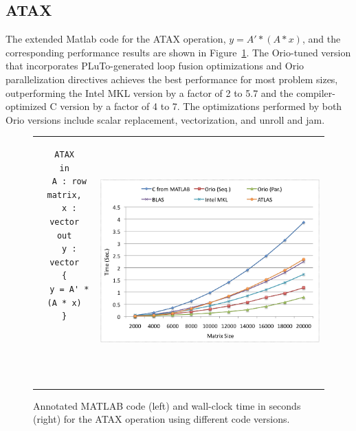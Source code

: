 \documentclass[runningheads]{llncs}
\begin{document}
\subsection{ATAX}

The extended Matlab code for the ATAX operation, $y = A' * (A * x)$, and the corresponding performance results are shown in Figure~\ref{fig:atax}. The Orio-tuned version that incorporates PLuTo-generated loop fusion optimizations and Orio parallelization directives achieves the best performance for most problem sizes, outperforming the Intel MKL version by a factor of 2 to 5.7 and the compiler-optimized C version by a factor of 4 to 7. The optimizations performed by both Orio versions include scalar replacement, vectorization, and unroll and jam.



\begin{figure}[htp]
\centering
\begin{tabular}{cc}
\begin{minipage}[b]{.3\textwidth}
\footnotesize
\begin{verbatim}
ATAX
in
  A : row matrix,
  x : vector
out
  y : vector
{
  y = A' * (A * x)
}





\end{verbatim}
\end{minipage}
&
\begin{minipage}[b]{.6\textwidth}
\includegraphics[width=\textwidth]{figures/atax.png}
\end{minipage}\\
\end{tabular}
\caption{Annotated MATLAB code (left) and wall-clock time in seconds (right) for the ATAX operation using different code versions.}
\label{fig:atax}
\end{figure}
\end{document}

